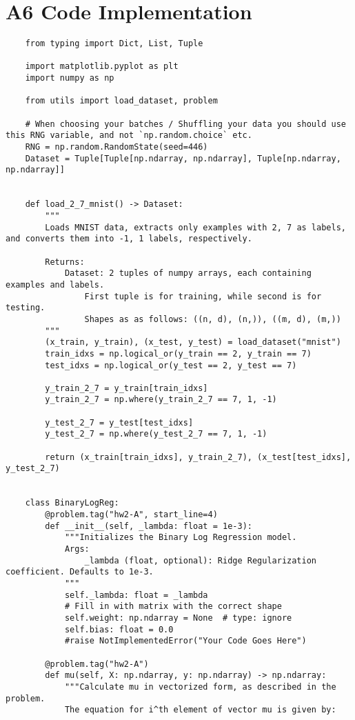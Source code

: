\documentclass{article}
\begin{document}
\section*{A6 Code Implementation}

\begin{lstlisting}
    from typing import Dict, List, Tuple

    import matplotlib.pyplot as plt
    import numpy as np
    
    from utils import load_dataset, problem
    
    # When choosing your batches / Shuffling your data you should use this RNG variable, and not `np.random.choice` etc.
    RNG = np.random.RandomState(seed=446)
    Dataset = Tuple[Tuple[np.ndarray, np.ndarray], Tuple[np.ndarray, np.ndarray]]
    
    
    def load_2_7_mnist() -> Dataset:
        """
        Loads MNIST data, extracts only examples with 2, 7 as labels, and converts them into -1, 1 labels, respectively.
    
        Returns:
            Dataset: 2 tuples of numpy arrays, each containing examples and labels.
                First tuple is for training, while second is for testing.
                Shapes as as follows: ((n, d), (n,)), ((m, d), (m,))
        """
        (x_train, y_train), (x_test, y_test) = load_dataset("mnist")
        train_idxs = np.logical_or(y_train == 2, y_train == 7)
        test_idxs = np.logical_or(y_test == 2, y_test == 7)
    
        y_train_2_7 = y_train[train_idxs]
        y_train_2_7 = np.where(y_train_2_7 == 7, 1, -1)
    
        y_test_2_7 = y_test[test_idxs]
        y_test_2_7 = np.where(y_test_2_7 == 7, 1, -1)
    
        return (x_train[train_idxs], y_train_2_7), (x_test[test_idxs], y_test_2_7)
    
    
    class BinaryLogReg:
        @problem.tag("hw2-A", start_line=4)
        def __init__(self, _lambda: float = 1e-3):
            """Initializes the Binary Log Regression model.
            Args:
                _lambda (float, optional): Ridge Regularization coefficient. Defaults to 1e-3.
            """
            self._lambda: float = _lambda
            # Fill in with matrix with the correct shape
            self.weight: np.ndarray = None  # type: ignore
            self.bias: float = 0.0
            #raise NotImplementedError("Your Code Goes Here")
    
        @problem.tag("hw2-A")
        def mu(self, X: np.ndarray, y: np.ndarray) -> np.ndarray:
            """Calculate mu in vectorized form, as described in the problem.
            The equation for i^th element of vector mu is given by:
    

\end{lstlisting}
\end{document}
